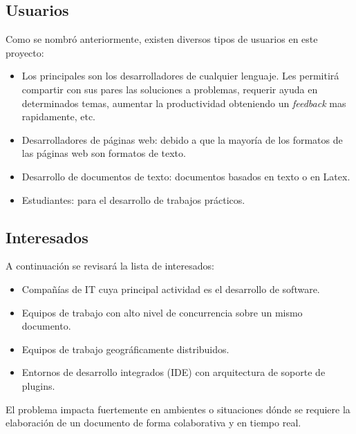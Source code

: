 \documentclass[a4paper,11pt]{article}
\begin{document}
		\subsection{Usuarios}
		    Como se nombr\'o anteriormente, existen diversos tipos de usuarios en este proyecto:

		    \begin{itemize}
				\item 	Los principales son los desarrolladores de cualquier lenguaje. Les permitir\'a
						compartir con sus pares las soluciones a problemas, requerir ayuda en
						determinados temas, aumentar la productividad obteniendo un \textit{feedback} mas
						rapidamente, etc.

				\item 	Desarrolladores de p\'aginas web: debido a que la mayor\'ia de los formatos
						de las p\'aginas web son formatos de texto.

				\item	Desarrollo de documentos de texto: documentos basados en texto o en Latex.

				\item	Estudiantes: para el desarrollo de trabajos pr\'acticos.

		    \end{itemize}

		\subsection{Interesados}
		    A continuaci\'on se revisar\'a la lista de interesados:

		    \begin{itemize}
				\item 	Compa\~n\'ias de IT cuya principal actividad es el desarrollo de software.

				\item 	Equipos de trabajo con alto nivel de concurrencia sobre un mismo documento.

				\item 	Equipos de trabajo geogr\'aficamente distribuidos.

				\item	Entornos de desarrollo integrados (IDE) con arquitectura de soporte de plugins.
		    \end{itemize}

		    El problema impacta fuertemente en ambientes o situaciones d\'onde se requiere
		    la elaboraci\'on de un documento de forma colaborativa y en tiempo real.
\end{document}
